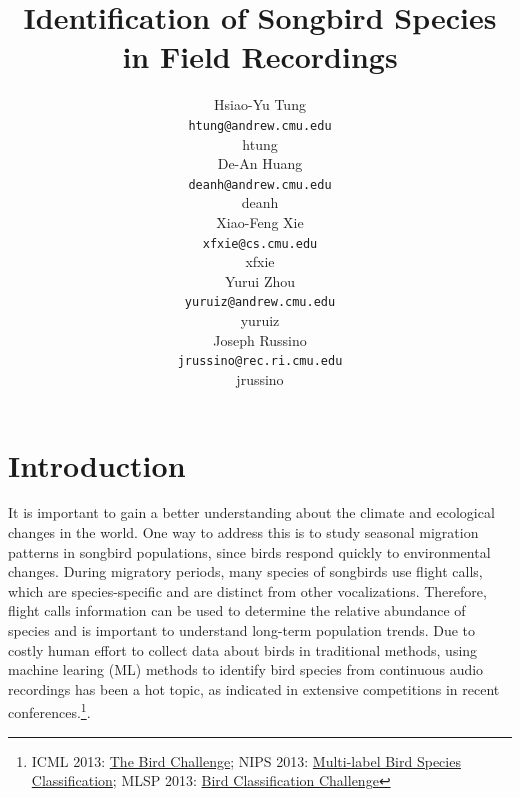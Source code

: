\documentclass{article} %
\title{Identification of Songbird Species in Field Recordings}
\author{
Hsiao-Yu Tung \\
\texttt{htung@andrew.cmu.edu} \\
htung \\
\And
De-An Huang \\
\texttt{deanh@andrew.cmu.edu} \\
deanh \\
\And
Xiao-Feng Xie \\
\texttt{xfxie@cs.cmu.edu} \\
xfxie \\
\And
Yurui Zhou\\
\texttt{yuruiz@andrew.cmu.edu}\\
yuruiz \\
\And
Joseph Russino\\
\texttt{jrussino@rec.ri.cmu.edu}\\
jrussino \\
}
\begin{document}
\maketitle

\begin{abstract}
\end{abstract}

\section{Introduction}

It is important to gain a better understanding about the climate and ecological changes in the world. One way to address this is to study seasonal migration patterns in songbird populations, since birds respond quickly to environmental changes.
During migratory periods, many species of songbirds use flight calls, which are species-specific and are distinct from other vocalizations. Therefore, flight calls information can be used to determine the relative abundance of species and is important to understand long-term population trends. Due to costly human effort to collect data about birds in traditional methods, using machine learing (ML) methods to identify bird species from continuous audio recordings has been a hot topic, as indicated in extensive competitions in recent conferences.\footnote{\scriptsize ICML 2013: \href{http://www.kaggle.com/c/the-icml-2013-bird-challenge}{The Bird Challenge}; NIPS 2013: \href{http://www.kaggle.com/c/multi-label-bird-species-classification-nips2013}{
Multi-label Bird Species Classification}; MLSP 2013: \href{http://www.kaggle.com/c/mlsp-2013-birds}{Bird Classification Challenge}}.
\end{document}
